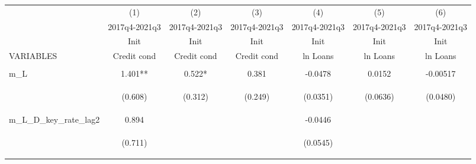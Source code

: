 \documentclass[]{article}
\begin{document}
\begin{center}
\begin{tabular}{lcccccc} \hline
 & (1) & (2) & (3) & (4) & (5) & (6) \\
 & 2017q4-2021q3 & 2017q4-2021q3 & 2017q4-2021q3 & 2017q4-2021q3 & 2017q4-2021q3 & 2017q4-2021q3 \\
 & Init & Init & Init & Init & Init & Init \\
VARIABLES & Credit cond & Credit cond & Credit cond & ln Loans & ln Loans & ln Loans \\ \hline
\vspace{4pt} & \begin{footnotesize}\end{footnotesize} & \begin{footnotesize}\end{footnotesize} & \begin{footnotesize}\end{footnotesize} & \begin{footnotesize}\end{footnotesize} & \begin{footnotesize}\end{footnotesize} & \begin{footnotesize}\end{footnotesize} \\
m\_L & 1.401** & 0.522* & 0.381 & -0.0478 & 0.0152 & -0.00517 \\
\vspace{4pt} & \begin{footnotesize}(0.608)\end{footnotesize} & \begin{footnotesize}(0.312)\end{footnotesize} & \begin{footnotesize}(0.249)\end{footnotesize} & \begin{footnotesize}(0.0351)\end{footnotesize} & \begin{footnotesize}(0.0636)\end{footnotesize} & \begin{footnotesize}(0.0480)\end{footnotesize} \\
m\_L\_D\_key\_rate\_lag2 & 0.894 &  &  & -0.0446 &  &  \\
\vspace{4pt} & \begin{footnotesize}(0.711)\end{footnotesize} & \begin{footnotesize}\end{footnotesize} & \begin{footnotesize}\end{footnotesize} & \begin{footnotesize}(0.0545)\end{footnotesize} & \begin{footnotesize}\end{footnotesize} & \begin{footnotesize}\end{footnotesize} \\

\end{tabular}
\end{center}
\end{document}
